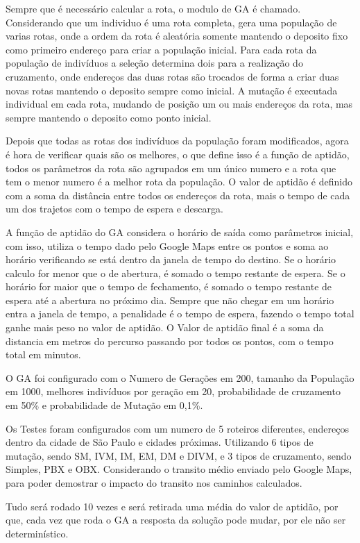 Sempre que é necessário calcular a rota, o modulo de GA é chamado. Considerando que um individuo é uma rota completa, gera uma população de varias rotas, onde a ordem da rota é aleatória somente mantendo o deposito fixo como primeiro endereço para criar a população inicial.
Para cada rota da população de indivíduos a seleção determina dois para a realização do cruzamento, onde endereços das duas rotas são trocados de forma a criar duas novas rotas mantendo o deposito sempre como inicial. A mutação é executada individual em cada rota, mudando de posição um ou mais endereços da rota, mas sempre 
mantendo o deposito como ponto inicial.

Depois que todas as rotas dos indivíduos da população foram modificados, agora é hora de verificar quais são os melhores, o que define isso é a função de aptidão, todos os parâmetros da rota são agrupados em um único numero e a rota que tem o menor numero é a melhor rota da população. O valor de aptidão é definido com a soma da distância entre todos os endereços da rota, mais o tempo de cada um dos trajetos com o tempo de espera e descarga.

A função de aptidão do GA considera o horário de saída como parâmetros inicial, com isso, utiliza o tempo dado pelo Google Maps entre os pontos e soma ao horário verificando se está dentro da janela de tempo do destino. Se o horário calculo for menor que o de abertura, é somado o tempo restante de espera. Se o horário for maior que o tempo de fechamento, é somado o tempo restante de espera até a abertura no próximo dia. Sempre que não chegar em um horário entra a janela de tempo, a penalidade é o tempo de espera, fazendo o tempo total ganhe mais peso no valor de aptidão. O Valor de aptidão final é a soma da distancia em metros do percurso passando por todos os pontos, com o tempo total em minutos.

O GA foi configurado com o Numero de Gerações em 200, tamanho da População em 1000, melhores indivíduos por geração em 20, probabilidade de cruzamento em 50\% e probabilidade de Mutação em 0,1\%.

Os Testes foram configurados com um numero de 5 roteiros diferentes, endereços dentro da cidade de São Paulo e cidades próximas. Utilizando 6 tipos de mutação, sendo SM, IVM, IM, EM, DM e DIVM, e 3 tipos de cruzamento, sendo Simples, PBX e OBX.
Considerando o transito médio enviado pelo Google Maps, para poder demostrar o impacto do transito nos caminhos calculados.

Tudo será rodado 10 vezes e será retirada uma média do valor de aptidão, por que, cada vez que roda o GA a resposta da solução pode mudar, por ele não ser determinístico.

